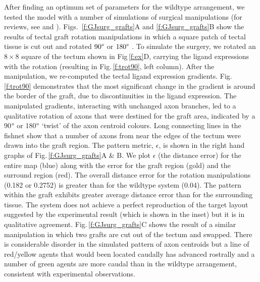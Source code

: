 \documentclass[9pt,lineno]{elife}
\begin{document}
After finding an optimum set of parameters for the wildtype arrangement, we tested the model with a number of simulations of surgical manipulations (for reviews, see \citet{udin_formation_1988} and \citet{goodhill_retinotectal_1999}). 
Figs.~\ref{f:GJsurg_grafts}A and \ref{f:GJsurg_grafts}B show the results of tectal graft rotation manipulations in which a square patch of tectal tissue is cut out and rotated $90\degree$ or $180\degree$ \citep{chung_observations_1978}. 
%
To simulate the surgery, we rotated an $8\times8$ square of the tectum shown in Fig\,\ref{f:ex}D, carrying the ligand expressions with the rotation (resulting in Fig.\,\ref{f:trot90}, left column). 
After the manipulation, we re-computed the tectal ligand expression gradients. Fig.\,\ref{f:trot90} demonstrates that the most significant change in the gradient is around the border of the graft, due to discontinuities in the ligand expression. 
The manipulated gradients, interacting with unchanged axon branches, led to a qualitative rotation of axons that were destined for the graft area, indicated by a 90$\degree$ or 180$\degree$ `twist' of the axon centroid colours. 
Long connecting lines in the fishnet show that a number of axons from near the edges of the tectum were drawn into the graft region. 
The pattern metric, $\epsilon$, is shown in the right hand graphs of Fig.\,\ref{f:GJsurg_grafts}A \& B. 
We plot $\epsilon$ (the distance error) for the entire map (blue) along with the error for the graft region (gold) and the surround region (red). 
The overall distance error for the rotation manipulations (0.182 or 0.2752)  is greater than for the wildtype system (0.04). 
The pattern within the graft exhibits greater average distance error than for the surrounding tissue.
The system does not achieve a perfect reproduction of the target layout suggested by the experimental result (which is shown in the inset) but it is in qualitative agreement.
%
Fig.\,\ref{f:GJsurg_grafts}C shows the result of a similar manipulation in which two grafts are cut out of the tectum and swapped. 
There is considerable disorder in the simulated pattern of axon centroids but a line of red/yellow agents that would been located caudally has advanced rostrally and a number of green agents are more caudal than in the wildtype arrangement, consistent with experimental observations.
\end{document}
